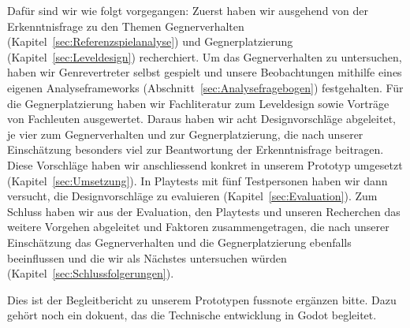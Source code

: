 \documentclass[../Main.tex]{subfiles}
\begin{document}
Dafür sind wir wie folgt vorgegangen: Zuerst haben wir ausgehend von der Erkenntnisfrage zu den Themen Gegnerverhalten (Kapitel~\ref{sec:Referenzspielanalyse}) und Gegnerplatzierung (Kapitel~\ref{sec:Leveldesign}) recherchiert. Um das Gegnerverhalten zu untersuchen, haben wir Genrevertreter selbst gespielt und unsere Beobachtungen mithilfe eines eigenen Analyseframeworks (Abschnitt~\ref{sec:Analysefragebogen}) festgehalten. Für die Gegnerplatzierung haben wir Fachliteratur zum Leveldesign sowie Vorträge von Fachleuten ausgewertet. Daraus haben wir acht Designvorschläge abgeleitet, je vier zum Gegnerverhalten und zur Gegnerplatzierung, die nach unserer Einschätzung besonders viel zur Beantwortung der Erkenntnisfrage beitragen. Diese Vorschläge haben wir anschliessend konkret in unserem Prototyp umgesetzt (Kapitel~\ref{sec:Umsetzung}). In Playtests mit fünf Testpersonen haben wir dann versucht, die Designvorschläge zu evaluieren (Kapitel~\ref{sec:Evaluation}). Zum Schluss haben wir aus der Evaluation, den Playtests und unseren Recherchen das weitere Vorgehen abgeleitet und Faktoren zusammengetragen, die nach unserer Einschätzung das Gegnerverhalten und die Gegnerplatzierung ebenfalls beeinflussen und die wir als Nächstes untersuchen würden (Kapitel~\ref{sec:Schlussfolgerungen}).

Dies ist der Begleitbericht zu unserem Prototypen fussnote ergänzen bitte. Dazu gehört noch ein dokuent, das die Technische entwicklung in Godot begleitet.
\end{document}
